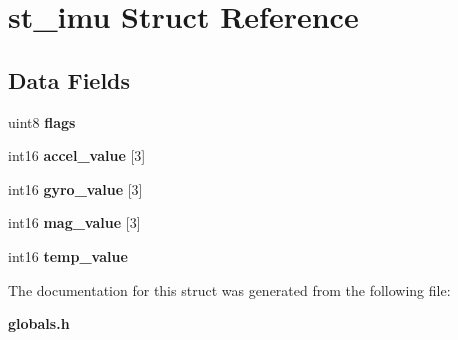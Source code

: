 \section{st\+\_\+imu Struct Reference}
\label{structst__imu}
\subsection*{Data Fields}
\begin{DoxyCompactItemize}
\item 
\mbox{\label{structst__imu_acd8859336a5cb8a70051c97a438726a1}} 
uint8 {\bfseries flags}
\item 
\mbox{\label{structst__imu_a76e9575b13f4c390ccec733a5dac028f}} 
int16 {\bfseries accel\+\_\+value} [3]
\item 
\mbox{\label{structst__imu_a515e671f6e4fe912e9af6c73a8d654b9}} 
int16 {\bfseries gyro\+\_\+value} [3]
\item 
\mbox{\label{structst__imu_ae78e11a5f5ad413f738f6eb69ac60277}} 
int16 {\bfseries mag\+\_\+value} [3]
\item 
\mbox{\label{structst__imu_a093731ce8df43a5beb8df6e78368ec4c}} 
int16 {\bfseries temp\+\_\+value}
\end{DoxyCompactItemize}


The documentation for this struct was generated from the following file\+:\begin{DoxyCompactItemize}
\item 
\textbf{ globals.\+h}\end{DoxyCompactItemize}
